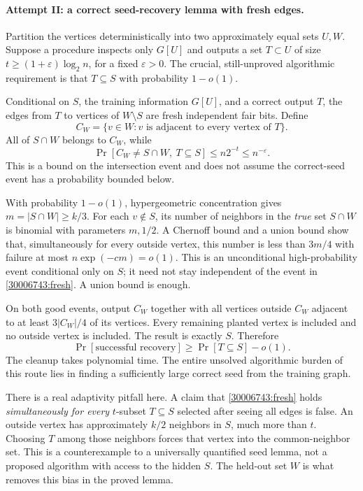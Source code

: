 \documentclass[11pt,a4paper]{article}
\numberwithin{equation}{section}
\begin{document}
\paragraph{Attempt II: a correct seed-recovery lemma with fresh edges.}
Partition the vertices deterministically into two approximately equal
sets $U,W$.  Suppose a procedure inspects only $G[U]$ and outputs a
set $T\subset U$ of size
$t\geq(1+\varepsilon)\log_2 n$, for a fixed $\varepsilon>0$.
The crucial, still-unproved algorithmic requirement is that
$T\subseteq S$ with probability $1-o(1)$.

Conditional on $S$, the training information $G[U]$, and a correct
output $T$, the edges from $T$ to vertices of $W\setminus S$ are
fresh independent fair bits.  Define
\[
 C_W=\{v\in W:v\text{ is adjacent to every vertex of }T\}.
\]
All of $S\cap W$ belongs to $C_W$, while
\begin{equation}\label{30006743:fresh}
 \Pr[C_W\ne S\cap W,\ T\subseteq S]
 \leq n2^{-t}\leq n^{-\varepsilon}.
\end{equation}
This is a bound on the intersection event and does not assume the
correct-seed event has a probability bounded below.

With probability $1-o(1)$, hypergeometric concentration gives
$m=|S\cap W|\geq k/3$.  For each $v\notin S$, its number of neighbors
in the \emph{true} set $S\cap W$ is binomial with parameters $m,1/2$.
A Chernoff bound and a union bound show that, simultaneously for every
outside vertex, this number is less than $3m/4$ with failure at most
$n\exp(-c m)=o(1)$.  This is an unconditional high-probability event
conditional only on $S$; it need not stay independent of the event in
\eqref{30006743:fresh}.  A union bound is enough.

On both good events, output $C_W$ together with all vertices outside
$C_W$ adjacent to at least $3|C_W|/4$ of its vertices.  Every remaining
planted vertex is included and no outside vertex is included.  The
result is exactly $S$.  Therefore
\begin{equation}\label{30006743:seedrecovery}
 \Pr[\text{successful recovery}]
 \geq\Pr[T\subseteq S]-o(1).
\end{equation}
The cleanup takes polynomial time.  The entire unsolved algorithmic
burden of this route lies in finding a sufficiently large correct
seed from the training graph.

There is a real adaptivity pitfall here.  A claim that
\eqref{30006743:fresh} holds \emph{simultaneously for every}
$t$-subset $T\subseteq S$ selected after seeing all edges is false.
An outside vertex has approximately $k/2$ neighbors in $S$, much more
than $t$.  Choosing $T$ among those neighbors forces that vertex into
the common-neighbor set.  This is a counterexample to a universally
quantified seed lemma, not a proposed algorithm with access to the
hidden $S$.  The held-out set $W$ is what removes this bias in the
proved lemma.
\end{document}
